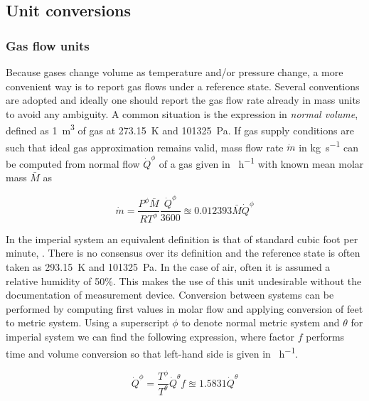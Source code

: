 \subsection{Unit conversions}

\subsubsection{Gas flow units}

Because gases change volume as temperature and/or pressure change, a more convenient way is to report gas flows under a reference state. Several conventions are adopted and ideally one should report the gas flow rate already in mass units to avoid any ambiguity. A common situation is the expression in \emph{normal volume}, defined as \SI{1}{\cubic\meter} of gas at \SI{273.15}{\kelvin} and \SI{101325}{\pascal}. If gas supply conditions are such that ideal gas approximation remains valid, mass flow rate $\dot{m}$ in \si{\kilo\gram\per\second} can be computed from normal flow $\dot{Q}^{\phi}$ of a gas given in \si{\Normcubicmeter\per\hour} with known mean molar mass $\bar{M}$ as

\begin{equation}
\dot{m}=\frac{P^{\phi}\bar{M}}{RT^{\phi}}\frac{\dot{Q}^{\phi}}{3600}\approxeq{}0.012393\bar{M}\dot{Q}^{\phi}
\end{equation} 

In the imperial system an equivalent definition is that of standard cubic foot per minute, \si{\scfm}. There is no consensus over its definition and the reference state is often taken as \SI{293.15}{\kelvin} and \SI{101325}{\pascal}. In the case of air, often it is assumed a relative humidity of 50\%. This makes the use of this unit undesirable without the documentation of measurement device. Conversion between systems can be performed by computing first values in molar flow and applying conversion of feet to metric system. Using a superscript $\phi$ to denote normal metric system and $\theta$ for imperial system we can find the following expression, where factor $f$ performs time and volume conversion so that left-hand side is given in \si{\Normcubicmeter\per\hour}.

\begin{equation}
\dot{Q}^{\phi}=\frac{T^{\phi}}{T^{\theta}}\dot{Q}^{\theta}f\approxeq{}1.5831\dot{Q}^{\theta}
\end{equation}

\endinput